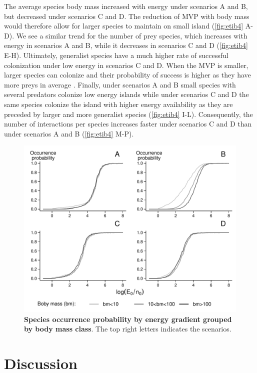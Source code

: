 The average species body mass increased with energy under scenarios A
and B, but decreased under scenarios C and D. The reduction of MVP with
body mass would therefore allow for larger species to maintain on small
island (\ref{fig:etib4} A-D). We see a similar trend for the number of
prey species, which increases with energy in scenarios A and B, while it
decreases in scenarios C and D (\ref{fig:etib4} E-H). Ultimately,
generalist species have a much higher rate of successful colonization
under low energy in scenarios C and D. When the MVP is smaller, larger
species can colonize and their probability of success is higher as they
have more preys in average \citep[due to the use of the niche model and
body mass as the niche axis][]{Williams2000, Gravel2013}. Finally, under
scenarios A and B small species with several predators colonize low
energy islands while under scenarios C and D the same species colonize
the island with higher energy availability as they are preceded by
larger and more generalist species (\ref{fig:etib4} I-L). Consequently,
the number of interactions per species increases faster under scenarios
C and D than under scenarios A and B (\ref{fig:etib4} M-P).

\begin{figure}[htbp]
\centering
\includegraphics{chapitre4/fig/fig3.pdf}
\caption{\textbf{Species occurrence probability by energy gradient
grouped by body mass class}. The top right letters indicates the
scenarios.\label{fig:etib3}}
\end{figure}

\section{Discussion}\label{discussion}

